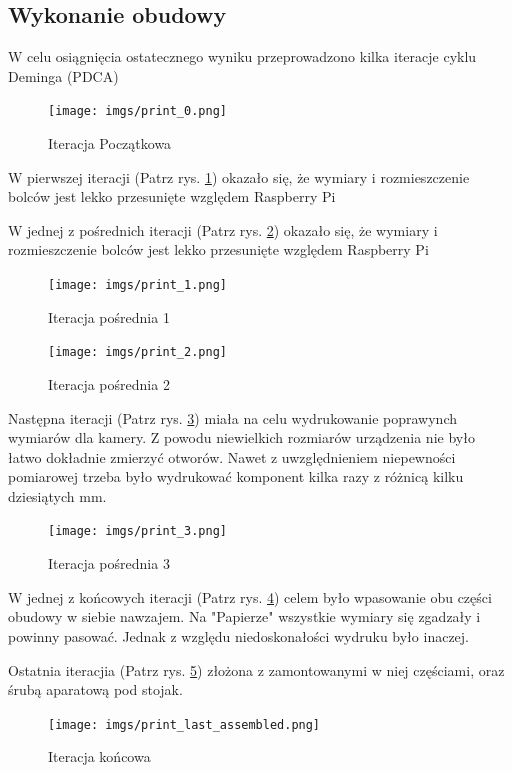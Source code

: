 \documentclass[a4paper,12pt,reqno]{article}
\begin{document}
\subsection{Wykonanie obudowy}
W celu osiągnięcia ostatecznego wyniku przeprowadzono \textcolor{edited}{kilka} iteracje cyklu Deminga (PDCA)

\begin{figure}[H]%
\centering
\texttt{[image: imgs/print\_0.png]}
\caption{Iteracja Początkowa \cite{img_by_me} \label{PDCA_00}}
\quad
\end{figure}

W pierwszej iteracji (Patrz rys. \ref{PDCA_00}) okazało się, że wymiary i rozmieszczenie bolców jest lekko przesunięte względem Raspberry Pi

\newpage
W jednej z pośrednich iteracji (Patrz rys. \ref{PDCA_01}) okazało się, że wymiary i rozmieszczenie bolców jest lekko przesunięte względem Raspberry Pi

\begin{figure}[H]%
\centering
\texttt{[image: imgs/print\_1.png]}
\caption{Iteracja pośrednia 1 \cite{img_by_me} \label{PDCA_01}}
\quad
\end{figure}

\begin{figure}[H]%
\centering
\texttt{[image: imgs/print\_2.png]}
\caption{Iteracja pośrednia 2 \cite{img_by_me} \label{PDCA_02}}
\quad
\end{figure}

Następna iteracji (Patrz rys. \ref{PDCA_02}) miała na celu wydrukowanie poprawynch wymiarów dla kamery. Z powodu niewielkich rozmiarów urządzenia nie było łatwo dokładnie zmierzyć otworów. Nawet z uwzględnieniem niepewności pomiarowej trzeba było wydrukować komponent kilka razy z różnicą kilku dziesiątych mm.

\begin{figure}[H]%
\centering
\texttt{[image: imgs/print\_3.png]}
\caption{Iteracja pośrednia 3 \cite{img_by_me} \label{PDCA_03}}
\quad
\end{figure}

W jednej z końcowych iteracji (Patrz rys. \ref{PDCA_03}) celem było wpasowanie obu części obudowy w siebie nawzajem. Na "Papierze" wszystkie wymiary się zgadzały i powinny pasować. Jednak z względu niedoskonałości wydruku było inaczej.

\newpage
Ostatnia iteracjia (Patrz rys. \ref{PDCA_END}) złożona z zamontowanymi w niej częściami, oraz śrubą aparatową pod stojak.
\begin{figure}[H]%
\centering
\texttt{[image: imgs/print\_last\_assembled.png]}
\caption{Iteracja końcowa \cite{img_by_me} \label{PDCA_END}}
\quad
\end{figure}
\end{document}
